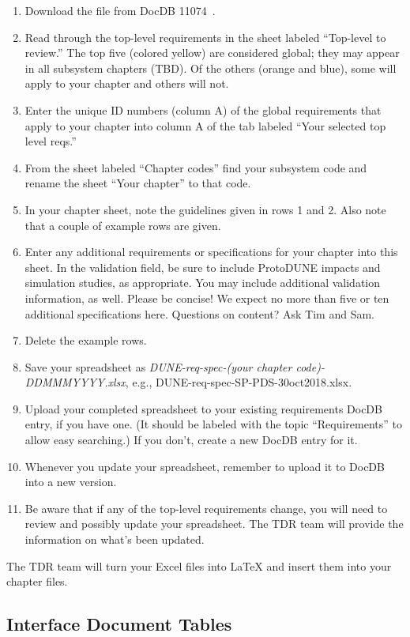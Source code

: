 \begin{enumerate}
\item Download the file from DocDB 11074~\cite{bib:docdb11074}.
\item Read through the top-level requirements in the sheet labeled ``Top-level to review.''  The top five (colored yellow) are considered global; they may appear in all subsystem chapters (TBD). Of the others (orange and blue), some will apply to your chapter and others will not.
\item Enter the unique ID numbers (column A) of the global requirements that apply to your chapter into column A of the tab labeled ``Your selected top level reqs.''
\item From the sheet labeled ``Chapter codes'' find your subsystem code and rename the sheet ``Your chapter'' to that code.
\item In your chapter sheet, note the guidelines given in rows 1 and 2. Also note that a couple of example rows are given.
\item  Enter any additional requirements or specifications for your chapter into this sheet.  In the validation field, be sure to include ProtoDUNE impacts and simulation studies, as appropriate. You may include additional validation information, as well.  Please be concise!  We expect no more than five or ten additional specifications here. Questions on content? Ask Tim and Sam.
\item Delete the example rows.
\item Save your spreadsheet as \textit{DUNE-req-spec-(your chapter code)-DDMMMYYYY.xlsx}, e.g., DUNE-req-spec-SP-PDS-30oct2018.xlsx.
\item Upload your completed spreadsheet to your existing requirements DocDB entry, if you have one. (It should be labeled with the topic ``Requirements'' to allow easy searching.) If you don't, create a new DocDB entry for it. 
\item Whenever you update your spreadsheet, remember to upload it to DocDB into a new version. 
\item Be aware that if any of the top-level requirements change, you will need to review and possibly update your spreadsheet.  The TDR team will provide the information on what's been updated.
\end{enumerate}

The TDR team will turn your Excel files into LaTeX and insert them into your chapter files.

\subsection{Interface Document Tables}
\label{sec:tables-intfc}

